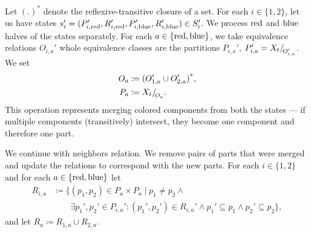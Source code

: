 Let \( {(.)}^* \) denote the reflexive-transitive closure of a set.
For each \( i \in \{1, 2\} \), let us have states
\( s_i' = (P_{i,\text{red}}', R_{i,\text{red}}', P_{i,\text{blue}}', R_{i,\text{blue}}') \in S_i' \).
%
We process \( \text{red} \) and \( \text{blue} \) halves of the states separately.
For each \( a \in \{\text{red}, \text{blue}\} \),
we take equivalence relations \( O_{i, a}' \)
whole equivalence classes are the partitions \( P_{i, a}' \),
\( P_{i, a}' = X_t{/\!}_{O_{i, a}'}\).
We set
%
\begin{align*}
	O_a & \coloneqq {(O_{1, a}' \cup O_{2, a}')}^*, \\
	P_a & \coloneqq X_t{/\!}_{O_a}.
\end{align*}
%
This operation represents merging colored components from both the states
--- if multiple components (transitively) intersect, they become one
component and therefore one part.

We continue with neighbors relation. We remove pairs of parts
that were merged and update the relations to correspond with the new parts.
For each \( i \in \{1, 2\} \) and for each \( a \in \{\text{red}, \text{blue}\} \) let
%
\begin{align*}
	R_{i,a} & \coloneqq \{(p_1, p_2) \in P_a \times P_a \mid p_{1} \ne p_{2} \land                                                    \\
	        & \qquad \exists p_1', p_2' \in P_{i,a}' : (p_1', p_2') \in R_{i,a}' \land p_1' \subseteq p_1 \land p_2' \subseteq p_2\},
\end{align*}
%
and let \( R_a \coloneqq R_{1,a} \cup R_{2,a} \).

